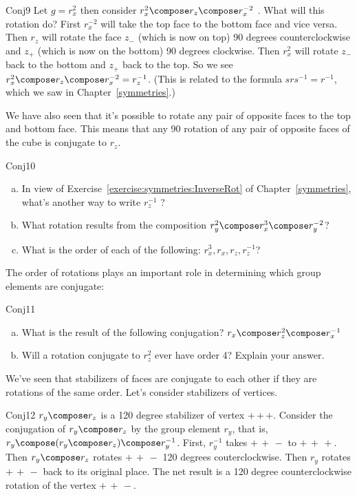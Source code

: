 \begin {example}{Conj9} 
Let  $g=r_x^2$ then consider $r_x^2\compose r_z\compose r_x^{-2}$ .   What will this rotation do? First $r_x^{-2}$ will take the top face to the bottom face and vice versa. Then $r_z$ will rotate the face $z_-$ (which is now on top)  90 degrees counterclockwise and  $z_+$ (which is now on the bottom) 90 degrees clockwise.  Then $r_x^2$ will rotate $z_-$ back to the bottom and $z_+$ back to the top.  So we see $r_x^2\compose r_z\compose r_x^{-2} = r_z^{-1}$. (This is related to the formula $s r s^{-1} = r^{-1}$, which we saw in Chapter~\ref{symmetries}.)  
\end{example}

We have also seen that it's possible to rotate any pair of opposite faces to the top and bottom face. This means that any 90 rotation of any pair of opposite faces of the cube is conjugate to $r_z$.  

\begin {exercise}{Conj10}
\begin {enumerate} [(a)]
\item In view of Exercise~\ref{exercise:symmetries:InverseRot} of Chapter~\ref{symmetries}, what's another way to write $r_z^{-1}$ ?  
\item What rotation results from the composition  $r_y^2\compose r_x^3\compose r_y^{-2}$?
\item What is the order of each of the following: $r_x^3, r_x, r_z, r_z^{-1}$? 
\end{enumerate}
\end{exercise}

The order of rotations plays an important role in determining which group elements are conjugate:

\begin {exercise}{Conj11}
\begin {enumerate}[(a)]
\item What is the result of the following conjugation? $r_x\compose r_z^2 \compose r_x^{-1}$
\item Will a rotation conjugate to $r_z^2$ ever have order 4?  Explain your answer.
\end {enumerate}
\end{exercise}

We've seen that stabilizers of faces are conjugate to each other if they are rotations of the same order.  Let's consider stabilizers of vertices.

\begin {example}{Conj12}
 $r_y\compose r_z$ is a 120 degree stabilizer of vertex {+\,+\,+}.  Consider the conjugation of $r_y\compose r_z$ by the group element $r_y$, that is,  $r_y\compose (r_y\compose r_z)\compose r_y^{-1}$. First, $r_y^{-1}$ takes ${+\,+\,-}$ to ${+\,+\,+}$.  Then $r_y\compose r_z$ rotates ${+\,+\,-}$ 120 degrees couterclockwise. Then $r_y$ rotates ${+\,+\,-}$ back to its original place.  The net result is a 120 degree counterclockwise rotation of the vertex ${+\,+\,-}$.
\end{example}

